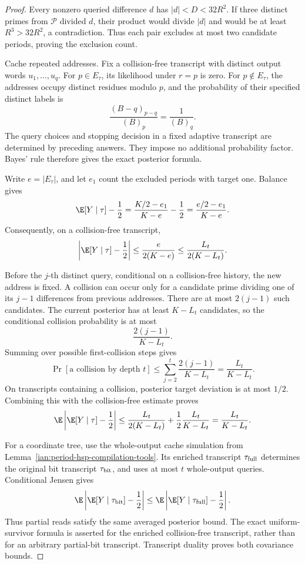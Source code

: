 \begin{proof}
Every nonzero queried difference \(d\) has \(|d|<D<32R^2\).
If three distinct primes from \(\mathcal P\) divided \(d\), their product would divide \(|d|\) and would be at least \(R^3>32R^2\), a contradiction. Thus each pair excludes at most two candidate periods, proving the exclusion count.

Cache repeated addresses. Fix a collision-free transcript with distinct output words \(u_1,\ldots,u_q\). For \(p\in E_\tau\), its likelihood under \(r=p\) is zero. For \(p\notin E_\tau\), the addresses occupy distinct residues modulo \(p\), and the probability of their specified distinct labels is
\[
 \frac{(B-q)_{p-q}}{(B)_p}
 =\frac1{(B)_q}.
\]
The query choices and stopping decision in a fixed adaptive transcript are determined by preceding answers. They impose no additional probability factor. Bayes' rule therefore gives the exact posterior formula.

Write \(e=|E_\tau|\), and let \(e_1\) count the excluded periods with target one. Balance gives
\[
 \E[Y\mid\tau]-\frac12
 =
 \frac{K/2-e_1}{K-e}-\frac12
 =
 \frac{e/2-e_1}{K-e}.
\]
Consequently, on a collision-free transcript,
\[
 \left|\E[Y\mid\tau]-\frac12\right|
 \le\frac{e}{2(K-e)}
 \le\frac{L_t}{2(K-L_t)}.
\]

Before the \(j\)-th distinct query, conditional on a collision-free history, the new address is fixed. A collision can occur only for a candidate prime dividing one of its \(j-1\) differences from previous addresses. There are at most \(2(j-1)\) such candidates. The current posterior has at least \(K-L_t\) candidates, so the conditional collision probability is at most
\[
 \frac{2(j-1)}{K-L_t}.
\]
Summing over possible first-collision steps gives
\[
 \Pr[\text{a collision by depth }t]
 \le\sum_{j=2}^t\frac{2(j-1)}{K-L_t}
 =\frac{L_t}{K-L_t}.
\]
On transcripts containing a collision, posterior target deviation is at most \(1/2\). Combining this with the collision-free estimate proves
\[
 \E\left|\E[Y\mid\tau]-\frac12\right|
 \le
 \frac{L_t}{2(K-L_t)}
 +\frac12\frac{L_t}{K-L_t}
 =\frac{L_t}{K-L_t}.
\]

For a coordinate tree, use the whole-output cache simulation from Lemma~\ref{ian:period-hsp-compilation-tools}. Its enriched transcript \(\tau_{\rm full}\) determines the original bit transcript \(\tau_{\rm bit}\), and uses at most \(t\) whole-output queries. Conditional Jensen gives
\[
 \E\left|\E[Y\mid\tau_{\rm bit}]-\frac12\right|
 \le
 \E\left|\E[Y\mid\tau_{\rm full}]-\frac12\right|.
\]
Thus partial reads satisfy the same averaged posterior bound. The exact uniform-survivor formula is asserted for the enriched collision-free transcript, rather than for an arbitrary partial-bit transcript. Transcript duality proves both covariance bounds.
\end{proof}

